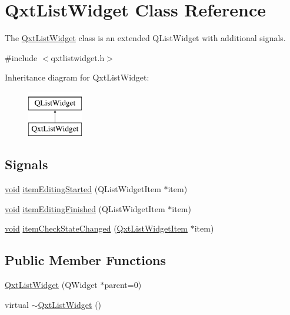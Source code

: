 \hypertarget{class_qxt_list_widget}{\section{Qxt\-List\-Widget Class Reference}
\label{class_qxt_list_widget}
}


The \hyperlink{class_qxt_list_widget}{Qxt\-List\-Widget} class is an extended Q\-List\-Widget with additional signals.  




{\ttfamily \#include $<$qxtlistwidget.\-h$>$}

Inheritance diagram for Qxt\-List\-Widget\-:\begin{figure}[H]
\begin{center}
\leavevmode
\includegraphics[height=2.000000cm]{class_qxt_list_widget}
\end{center}
\end{figure}
\subsection*{Signals}
\begin{DoxyCompactItemize}
\item 
\hyperlink{group___u_a_v_objects_plugin_ga444cf2ff3f0ecbe028adce838d373f5c}{void} \hyperlink{class_qxt_list_widget_a71aec78eda7abb733fbb2cce006a6b99}{item\-Editing\-Started} (Q\-List\-Widget\-Item $\ast$item)
\item 
\hyperlink{group___u_a_v_objects_plugin_ga444cf2ff3f0ecbe028adce838d373f5c}{void} \hyperlink{class_qxt_list_widget_a41f46cde9f615200cafa140bcd8d1d48}{item\-Editing\-Finished} (Q\-List\-Widget\-Item $\ast$item)
\item 
\hyperlink{group___u_a_v_objects_plugin_ga444cf2ff3f0ecbe028adce838d373f5c}{void} \hyperlink{class_qxt_list_widget_aeb44b3168d349b046b5c4ad351faa442}{item\-Check\-State\-Changed} (\hyperlink{class_qxt_list_widget_item}{Qxt\-List\-Widget\-Item} $\ast$item)
\end{DoxyCompactItemize}
\subsection*{Public Member Functions}
\begin{DoxyCompactItemize}
\item 
\hyperlink{class_qxt_list_widget_a38aa58fb5ec7f76262377714f03715ae}{Qxt\-List\-Widget} (Q\-Widget $\ast$parent=0)
\item 
virtual \hyperlink{class_qxt_list_widget_a3fa762bafe48b3d09b3e1f6bae05a650}{$\sim$\-Qxt\-List\-Widget} ()
\end{DoxyCompactItemize}


